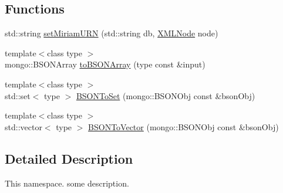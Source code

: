 \subsection*{Functions}
\begin{DoxyCompactItemize}
\item 
std\-::string \hyperlink{namespaceunisys_a34d383680495fae6b5cfa615ef4e234b}{set\-Miriam\-U\-R\-N} (std\-::string db, \hyperlink{structXMLNode}{X\-M\-L\-Node} node)
\item 
{\footnotesize template$<$class type $>$ }\\mongo\-::\-B\-S\-O\-N\-Array \hyperlink{namespaceunisys_ab99d42c514d40e0a3752a9d97e8049f6}{to\-B\-S\-O\-N\-Array} (type const \&input)
\item 
{\footnotesize template$<$class type $>$ }\\std\-::set$<$ type $>$ \hyperlink{namespaceunisys_a3fcaf2bd3c84c1169b4d7771ad49520b}{B\-S\-O\-N\-To\-Set} (mongo\-::\-B\-S\-O\-N\-Obj const \&bson\-Obj)
\item 
{\footnotesize template$<$class type $>$ }\\std\-::vector$<$ type $>$ \hyperlink{namespaceunisys_a9f6f070f7120ff13e625fe438dc14dea}{B\-S\-O\-N\-To\-Vector} (mongo\-::\-B\-S\-O\-N\-Obj const \&bson\-Obj)
\end{DoxyCompactItemize}


\subsection{Detailed Description}
This namespace. some description. 

